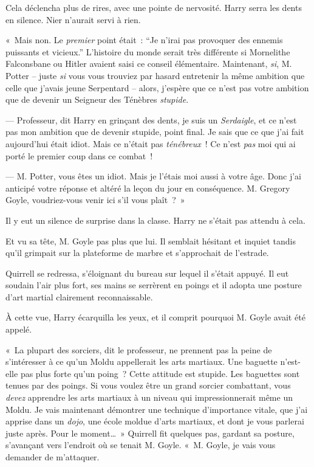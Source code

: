Cela déclencha plus de rires, avec une pointe de nervosité.
Harry serra les dents en silence.
Nier n'aurait servi à rien.

«~Mais non.
Le \emph{premier} point était~: “Je n'irai pas provoquer des ennemis puissants et vicieux.” L'histoire du monde serait très différente si Mornelithe Falconsbane ou Hitler avaient saisi ce conseil élémentaire.
Maintenant, \emph{si}, M. Potter -- juste \emph{si} vous vous trouviez par hasard entretenir la même ambition que celle que j'avais jeune Serpentard -- alors, j'espère que ce n'est pas votre ambition que de devenir un Seigneur des Ténèbres \emph{stupide}.

--- Professeur, dit Harry en grinçant des dents, je suis un \emph{Serdaigle}, et ce n'est pas mon ambition que de devenir stupide, point final.
Je sais que ce que j'ai fait aujourd'hui était idiot.
Mais ce n'était pas \emph{ténébreux}~!
Ce n'est \emph{pas} moi qui ai porté le premier coup dans ce combat~!

--- M. Potter, vous êtes un idiot.
Mais je l'étais moi aussi à votre âge.
Donc j'ai anticipé votre réponse et altéré la leçon du jour en conséquence.
M. Gregory Goyle, voudriez-vous venir ici s'il vous plaît~?~»

Il y eut un silence de surprise dans la classe.
Harry ne s'était pas attendu à cela.

Et vu sa tête, M. Goyle pas plus que lui.
Il semblait hésitant et inquiet tandis qu'il grimpait sur la plateforme de marbre et s'approchait de l'estrade.

Quirrell se redressa, s'éloignant du bureau sur lequel il s'était appuyé.
Il eut soudain l'air plus fort, ses mains se serrèrent en poings et il adopta une posture d'art martial clairement reconnaissable.

À cette vue, Harry écarquilla les yeux, et il comprit pourquoi M. Goyle avait été appelé.

«~La plupart des sorciers, dit le professeur, ne prennent pas la peine de s'intéresser à ce qu'un Moldu appellerait les arts martiaux.
Une baguette n'est-elle pas plus forte qu'un poing~?
Cette attitude est stupide.
Les baguettes sont tenues par des poings.
Si vous voulez être un grand sorcier combattant, vous \emph{devez} apprendre les arts martiaux à un niveau qui impressionnerait même un Moldu.
Je vais maintenant démontrer une technique d'importance vitale, que j'ai apprise dans un \emph{dojo}, une école moldue d'arts martiaux, et dont je vous parlerai juste après.
Pour le moment…~»
Quirrell fit quelques pas, gardant sa posture, s'avançant vers l'endroit où se tenait M. Goyle.
«~M. Goyle, je vais vous demander de m'attaquer.

